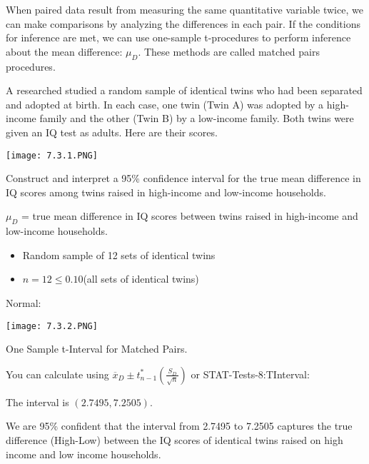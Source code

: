 \documentclass[../stats.tex]{subfiles}
\begin{document}
When paired data result from measuring the same quantitative variable twice, we can make comparisons by analyzing the differences in each pair. If the conditions for inference are met, we can use one-sample t-procedures to perform inference about the mean difference: $\mu_D$.
These methods are called matched pairs procedures.

\begin{example}
    A researched studied a random sample of identical twins who had been separated and adopted at birth. In each case, one twin (Twin A) was adopted by a high-income family and the other (Twin B) by a low-income family. Both twins were given an IQ test as adults. Here are their scores.
    \begin{center}
        \texttt{[image: 7.3.1.PNG]}
    \end{center}

    Construct and interpret a 95\% confidence interval for the true mean difference in IQ scores among twins raised in high-income and low-income households.

    $\mu_D$ = true mean difference in IQ scores between twins raised in high-income and low-income households.

    \begin{itemize}
        \item Random sample of 12 sets of identical twins 
        \item $n=12\leq 0.10$(all sets of identical twins)
    \end{itemize}
    Normal:
    \begin{center}
        \texttt{[image: 7.3.2.PNG]}
    \end{center}

    One Sample t-Interval for Matched Pairs.

    You can calculate using $\overline{x}_D\pm t^*_{n-1}\left(\frac{S_D}{\sqrt{n}}\right)$ or STAT-Tests-8:TInterval:

    The interval is $(2.7495, 7.2505)$.

    We are 95\% confident that the interval from 2.7495 to 7.2505 captures the true difference (High-Low) between the IQ scores of identical twins raised on high income and low income households.
\end{example}
\end{document}
